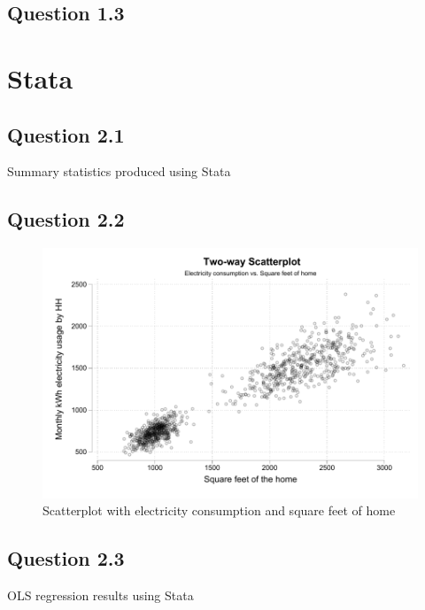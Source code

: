 \documentclass{article}
\begin{document}
\subsection*{Question 1.3}

\section*{Stata}

\subsection*{Question 2.1}


\begin{table}[ht]
    \centering
    
    \caption{Summary statistics produced using Stata}
    \label{tab:my_label}
\end{table}

\subsection*{Question 2.2}

\begin{figure}[ht]
    \centering
    \includegraphics[scale = 0.7]{homework 2/output/figure/scatterplot.pdf}
    \caption{Scatterplot with electricity consumption and square feet of home}
      \label{fig:scatter}
\end{figure}

\subsection*{Question 2.3}
\begin{table}[ht]
    \centering
    
    \caption{OLS regression results using Stata}
     \label{tab:my_label}
  \end{table}
\end{document}
